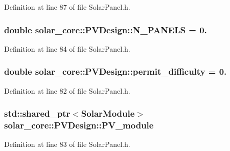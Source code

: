 Definition at line 87 of file Solar\+Panel.\+h.

\hypertarget{classsolar__core_1_1_p_v_design_abef277ad010afb4ab6c6c13113a8c017}{}
\subsubsection[{N\+\_\+\+P\+A\+N\+E\+L\+S}]{\setlength{\rightskip}{0pt plus 5cm}double solar\+\_\+core\+::\+P\+V\+Design\+::\+N\+\_\+\+P\+A\+N\+E\+L\+S = 0.}\label{classsolar__core_1_1_p_v_design_abef277ad010afb4ab6c6c13113a8c017}


Definition at line 84 of file Solar\+Panel.\+h.

\hypertarget{classsolar__core_1_1_p_v_design_a8c2897033c697a6dcfb96787358dc64f}{}
\subsubsection[{permit\+\_\+difficulty}]{\setlength{\rightskip}{0pt plus 5cm}double solar\+\_\+core\+::\+P\+V\+Design\+::permit\+\_\+difficulty = 0.}\label{classsolar__core_1_1_p_v_design_a8c2897033c697a6dcfb96787358dc64f}


Definition at line 82 of file Solar\+Panel.\+h.

\hypertarget{classsolar__core_1_1_p_v_design_a89f2b59847de64cab26b56f21ace4e6c}{}
\subsubsection[{P\+V\+\_\+module}]{\setlength{\rightskip}{0pt plus 5cm}std\+::shared\+\_\+ptr$<${\bf Solar\+Module}$>$ solar\+\_\+core\+::\+P\+V\+Design\+::\+P\+V\+\_\+module}\label{classsolar__core_1_1_p_v_design_a89f2b59847de64cab26b56f21ace4e6c}


Definition at line 83 of file Solar\+Panel.\+h.

